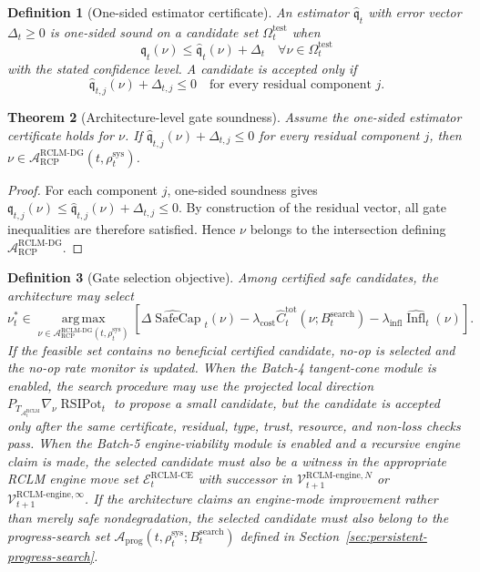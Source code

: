 \documentclass[11pt,a4paper]{article}
\newtheorem{theorem}{Theorem}[section]
\newtheorem{definition}[theorem]{Definition}
\newcommand{\Acal}{\mathcal A}
\newcommand{\Vcal}{\mathcal V}
\newcommand{\argmax}{\operatorname*{arg\,max}}
\newcommand{\RCP}{\mathrm{RCP}}
\newcommand{\RCLM}{\mathrm{RCLM}}
\newcommand{\DG}{\mathrm{DG}}
\newcommand{\sys}{\mathrm{sys}}
\newcommand{\SafeCap}{\operatorname{SafeCap}}
\newcommand{\test}{\mathrm{test}}
\newcommand{\search}{\mathrm{search}}
\newcommand{\cost}{\mathrm{cost}}
\newcommand{\infl}{\mathrm{infl}}
\newcommand{\tot}{\mathrm{tot}}
\newcommand{\engine}{\mathrm{engine}}
\newcommand{\RSIPot}{\operatorname{RSIPot}}
\newcommand{\CE}{\mathrm{CE}}
\begin{document}
\begin{definition}[One-sided estimator certificate]
An estimator \(\widehat{\mathfrak q}_t\) with error vector \(\Delta_t\ge0\) is one-sided sound on a candidate set \(\Omega_t^{\test}\) when
\[
\mathfrak q_t(\nu)\le \widehat{\mathfrak q}_t(\nu)+\Delta_t
\quad\forall \nu\in\Omega_t^{\test}
\]
with the stated confidence level.  A candidate is accepted only if
\[
\widehat{\mathfrak q}_{t,j}(\nu)+\Delta_{t,j}\le0
\quad\text{for every residual component }j.
\]
\end{definition}

\begin{theorem}[Architecture-level gate soundness]
\label{thm:architecture-gate-soundness}
Assume the one-sided estimator certificate holds for \(\nu\).  If \(\widehat{\mathfrak q}_{t,j}(\nu)+\Delta_{t,j}\le0\) for every residual component \(j\), then \(\nu\in\Acal_{\RCP}^{\RCLM\text{-}\DG}(t,\rho_t^{\sys})\).
\end{theorem}

\begin{proof}
For each component \(j\), one-sided soundness gives \(\mathfrak q_{t,j}(\nu)\le\widehat{\mathfrak q}_{t,j}(\nu)+\Delta_{t,j}\le0\).  By construction of the residual vector, all gate inequalities are therefore satisfied.  Hence \(\nu\) belongs to the intersection defining \(\Acal_{\RCP}^{\RCLM\text{-}\DG}\).
\end{proof}

\begin{definition}[Gate selection objective]
Among certified safe candidates, the architecture may select
\[
\nu_t^*\in\argmax_{\nu\in\Acal_{\RCP}^{\RCLM\text{-}\DG}(t,\rho_t^{\sys})}
\left[
\widehat{\Delta\SafeCap}_t(\nu)-\lambda_{\cost}\widehat C_t^{\tot}(\nu;B_t^{\search})-\lambda_{\infl}\widehat{\operatorname{Infl}}_t(\nu)
\right].
\]
If the feasible set contains no beneficial certified candidate, no-op is selected and the no-op rate monitor is updated.  When the Batch-4 tangent-cone module is enabled, the search procedure may use the projected local direction \(P_{T_{\Acal_t^{\RCLM}}}\nabla_\nu\RSIPot_t\) to propose a small candidate, but the candidate is accepted only after the same certificate, residual, type, trust, resource, and non-loss checks pass. When the Batch-5 engine-viability module is enabled and a recursive engine claim is made, the selected candidate must also be a witness in the appropriate RCLM engine move set \(\mathcal E_t^{\RCLM\text{-}\CE}\) with successor in \(\Vcal_{t+1}^{\RCLM\text{-}\engine,N}\) or \(\Vcal_{t+1}^{\RCLM\text{-}\engine,\infty}\). If the architecture claims an engine-mode improvement rather than merely safe nondegradation, the selected candidate must also belong to the progress-search set \(\Acal_{\mathrm{prog}}(t,\rho_t^{\sys};B_t^{\search})\) defined in Section~\ref{sec:persistent-progress-search}.
\end{definition}
\end{document}
